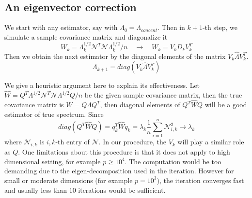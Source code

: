 \documentclass[12pt]{extarticle}
\newcommand{\cN}{{\mathcal{N}}}
\newcommand{\1}{\field{1}}
\numberwithin{equation}{section}
\begin{document}






\subsection{An eigenvector correction } \label{sec:iterative eigenvector correction}
We start with any estimator, say with $\Lambda_0=\Lambda_{concent}$. Then in $k+1$-th step, we simulate a sample covariance matrix and diagonalize it
\[
W_{k}=\Lambda_k^{1/2} \cN^T \cN \Lambda_k^{1/2} /n \quad \to\quad W_k= V_k D_k V_k^T
\]
Then we obtain the next estimator by the diagonal elements of the matrix $V_k \hat{\Lambda} V_k^T$.
\[
\Lambda_{k+1}= diag(V_k \hat{\Lambda} V_k^T)
\]






We give a heuristic argument here to explain its effectiveness. Let $\hat{W}=Q^T\Lambda^{1/2} \cN^T \cN \Lambda^{1/2} Q/n$ be the given sample covariance matrix, then the true covariance matrix is $W= Q \Lambda Q^T$, then diagonal elements of $Q^T \hat{W} Q$ will be a good estimator of true spectrum. Since 
\[
diag(Q^T \hat{W} Q) = q_k^T \hat{W} q_k= \lambda_k \frac{1}{n}\sum_{i=1}^{n} \cN_{i,k}^2 \to \lambda_k
\]
where $\cN_{i,k}$ is $i,k$-th entry of $\cN$. In our procedure, the $V_k$ will play a similar role as $Q$. One limitations about this procedure is that it does not apply to high dimensional setting, for example $p\ge 10^4$. The computation would be too demanding due to the eigen-decomposition used in the iteration. However for small or moderate dimensions (for example $p= 10^3$), the iteration converges fast and usually less than $10$ iterations would be sufficient.
\end{document}

